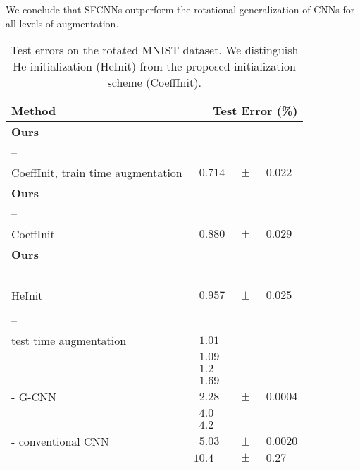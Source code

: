 \documentclass[10pt,twocolumn,letterpaper]{article}
\begin{document}
We conclude that \mbox{SFCNNs} outperform the rotational generalization of CNNs for all levels of augmentation.

\begin{table}[!t]
	\centering
	\footnotesize
	\renewcommand{\arraystretch}{.95}
	\begin{tabular}{l@{\hskip 4.4ex}r@{\hskip .3ex}c@{\hskip .3ex}l}
		\toprule
		Method								& \multicolumn{3}{r}{Test Error (\%)} 	\\
		\toprule
		\textbf{Ours}\\--\\CoeffInit, train time augmentation & $\mathbf{0.714}$ 	& $\ \mathbf{\pm}\ $ & $\mathbf{0.022}$ \\
		\textbf{Ours}\\--\\CoeffInit	& $0.880$ 	 & $\ \pm\ $ & $0.029$  \\
		\textbf{Ours}\\--\\HeInit		& $0.957$ 	 & $\ \pm\ $ & $0.025$ \\
		\citet{marcos2016rotation}\\--\\test time augmentation & $1.01 \phantom{0}$ &&\\
		\citet{marcos2016rotation} 			& $1.09 \phantom{0}$ &&\\
		\citet{laptev2016ti} 				& $1.2  \phantom{00}$&&\\
		\citet{worrall2016harmonic} 		& $1.69 \phantom{0}$ &&\\
		\citet{cohen2016group} - G-CNN		& $2.28 \phantom{0}$ & $\ \pm\ $ & $0.0004$ \\
		\citet{schmidt2012learning}	 		& $4.0 \phantom{00}$ &&\\
		\citet{ICML2012Sohn_659}			& $4.2 \phantom{00}$ &&\\
		\citet{cohen2016group} - conventional CNN		& $5.03 \phantom{0}$ & $\ \pm\ $ & $0.0020$ \\
		\citet{larochelle2007empirical}		& $10.4\phantom{00}$ & $\ \pm\ $ & $0.27$ \\
		\bottomrule
	\end{tabular}
	\vspace{-1.5ex}
	\caption{
		Test errors on the rotated MNIST dataset.
		We distinguish He initialization (HeInit) from the proposed initialization scheme (CoeffInit).
		}
	\vspace{-3.5ex}
	\label{tab:mnist_rot_results}
\end{table}
\end{document}
